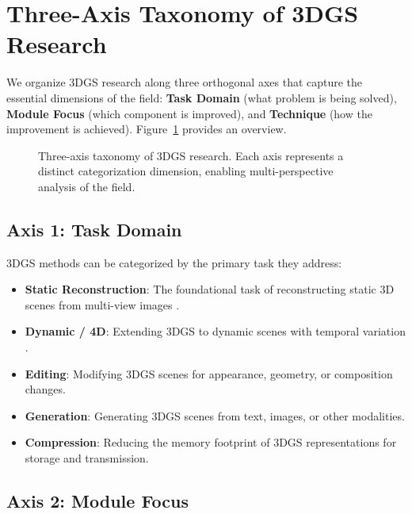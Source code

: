 \section{Three-Axis Taxonomy of 3DGS Research}
\label{sec:taxonomy}

We organize 3DGS research along three orthogonal axes that capture
the essential dimensions of the field:
\textbf{Task Domain} (what problem is being solved),
\textbf{Module Focus} (which component is improved), and
\textbf{Technique} (how the improvement is achieved).
Figure~\ref{fig:taxonomy} provides an overview.

\begin{figure}[t]
    \centering
    \caption{Three-axis taxonomy of 3DGS research. Each axis represents
    a distinct categorization dimension, enabling multi-perspective
    analysis of the field.}
    \label{fig:taxonomy}
\end{figure}

\subsection{Axis 1: Task Domain}
\label{sec:taxonomy:task}

3DGS methods can be categorized by the primary task they address:

\begin{itemize}[leftmargin=*]
    \item \textbf{Static Reconstruction}: The foundational task of
          reconstructing static 3D scenes from multi-view images
          \cite{kerbl3Dgaussians, yu2024mipsplatting}.
    \item \textbf{Dynamic / 4D}: Extending 3DGS to dynamic scenes with
          temporal variation \cite{wu20244dgs, yang2024deformable}.
    \item \textbf{Editing}: Modifying 3DGS scenes for appearance,
          geometry, or composition changes.
    \item \textbf{Generation}: Generating 3DGS scenes from text, images,
          or other modalities.
    \item \textbf{Compression}: Reducing the memory footprint of 3DGS
          representations for storage and transmission.
\end{itemize}

\subsection{Axis 2: Module Focus}
\label{sec:taxonomy:module}

